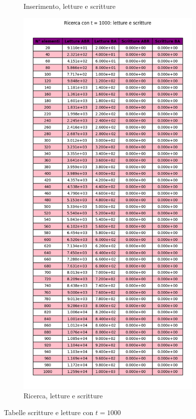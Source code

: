 \begin{figure}[H]
\begin{subfigure}[b]{0.49\textwidth}
        \caption{Inserimento, letture e scritture}
        \label{fig:tableinsertwr1000}
    \end{subfigure}
    \hfill
    \begin{subfigure}[b]{0.49\textwidth}
        \centering
        \includegraphics[width=\textwidth]{tables/search-wr-t1000.png}
        \caption{Ricerca, letture e scritture}
        \label{fig:tablesearchwr1000}
    \end{subfigure}
    \caption{Tabelle scritture e letture con $t=1000$}
    \label{fig:tablewr1000}
\end{figure}


